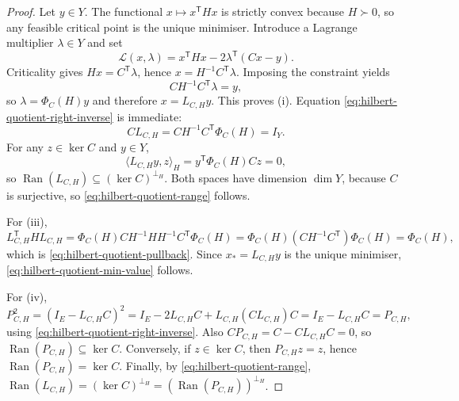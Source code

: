 \documentclass[11pt,a4paper]{article}
\numberwithin{equation}{section}
\DeclareMathOperator{\Ran}{Ran}
\theoremstyle{thmcompact}
\theoremstyle{remark}
\begin{document}
\begin{proof}
Let $y \in Y$. The functional $x \mapsto x^{\mathsf T}Hx$ is strictly convex because $H \succ 0$, so any feasible critical point is the unique minimiser. Introduce a Lagrange multiplier $\lambda \in Y$ and set
\[
\mathcal{L}(x,\lambda)=x^{\mathsf T}Hx-2\lambda^{\mathsf T}(Cx-y).
\]
Criticality gives $Hx=C^{\mathsf T}\lambda$, hence $x=H^{-1}C^{\mathsf T}\lambda$. Imposing the constraint yields
\[
CH^{-1}C^{\mathsf T}\lambda=y,
\]
so $\lambda=\Phi_C(H)y$ and therefore $x=L_{C,H}y$. This proves (i). Equation \eqref{eq:hilbert-quotient-right-inverse} is immediate:
\[
CL_{C,H}=CH^{-1}C^{\mathsf T}\Phi_C(H)=I_Y.
\]
For any $z \in \ker C$ and $y \in Y$,
\[
\langle L_{C,H}y,z\rangle_H = y^{\mathsf T}\Phi_C(H)Cz=0,
\]
so $\Ran(L_{C,H})\subseteq (\ker C)^{\perp_H}$. Both spaces have dimension $\dim Y$, because $C$ is surjective, so \eqref{eq:hilbert-quotient-range} follows.

For (iii),
\[
L_{C,H}^{\mathsf T}HL_{C,H}
=\Phi_C(H)CH^{-1}HH^{-1}C^{\mathsf T}\Phi_C(H)
=\Phi_C(H)(CH^{-1}C^{\mathsf T})\Phi_C(H)
=\Phi_C(H),
\]
which is \eqref{eq:hilbert-quotient-pullback}. Since $x_*=L_{C,H}y$ is the unique minimiser, \eqref{eq:hilbert-quotient-min-value} follows.

For (iv),
\[
P_{C,H}^2=(I_E-L_{C,H}C)^2=I_E-2L_{C,H}C+L_{C,H}(CL_{C,H})C=I_E-L_{C,H}C=P_{C,H},
\]
using \eqref{eq:hilbert-quotient-right-inverse}. Also $CP_{C,H}=C-CL_{C,H}C=0$, so $\Ran(P_{C,H})\subseteq \ker C$. Conversely, if $z \in \ker C$, then $P_{C,H}z=z$, hence $\Ran(P_{C,H})=\ker C$. Finally, by \eqref{eq:hilbert-quotient-range}, $\Ran(L_{C,H})=(\ker C)^{\perp_H}=(\Ran(P_{C,H}))^{\perp_H}$.
\end{proof}
\end{document}
